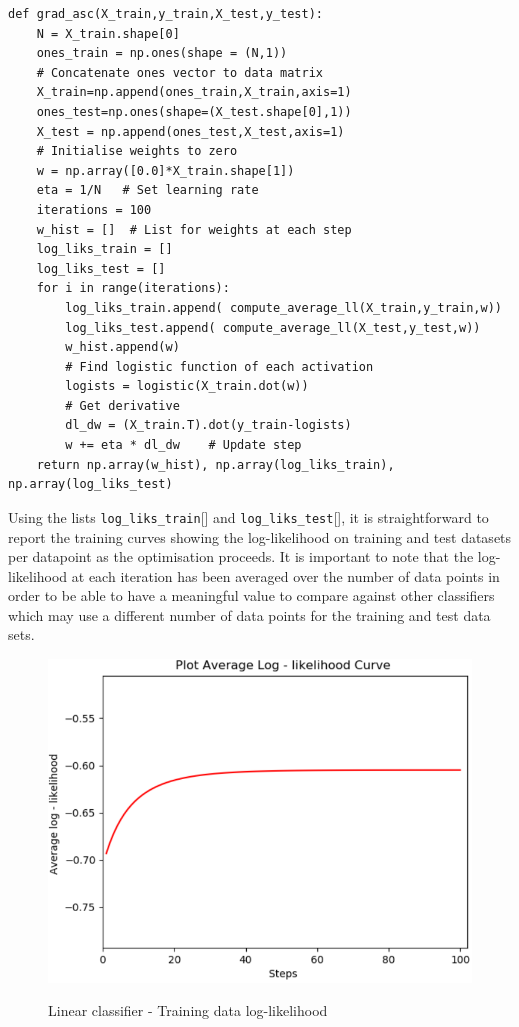 \documentclass[twocolumn]{article}
\begin{document}
\begin{verbatim}
def grad_asc(X_train,y_train,X_test,y_test):
    N = X_train.shape[0]
    ones_train = np.ones(shape = (N,1))
    # Concatenate ones vector to data matrix
    X_train=np.append(ones_train,X_train,axis=1)   
    ones_test=np.ones(shape=(X_test.shape[0],1))
    X_test = np.append(ones_test,X_test,axis=1)
    # Initialise weights to zero
    w = np.array([0.0]*X_train.shape[1])  
    eta = 1/N   # Set learning rate
    iterations = 100 
    w_hist = []  # List for weights at each step
    log_liks_train = []
    log_liks_test = []
    for i in range(iterations):
        log_liks_train.append( compute_average_ll(X_train,y_train,w))
        log_liks_test.append( compute_average_ll(X_test,y_test,w))
        w_hist.append(w)
        # Find logistic function of each activation
        logists = logistic(X_train.dot(w))
        # Get derivative
        dl_dw = (X_train.T).dot(y_train-logists)
        w += eta * dl_dw    # Update step
    return np.array(w_hist), np.array(log_liks_train), np.array(log_liks_test)
\end{verbatim}

Using the lists \texttt{log\_liks\_train}[] and \texttt{log\_liks\_test}[], it is straightforward to report the training curves showing the log-likelihood on training and test datasets per datapoint as the optimisation proceeds. It is important to note that the log-likelihood at each iteration has been averaged over the number of data points in order to be able to have a meaningful value to compare against other classifiers which may use a different number of data points for the training and test data sets.

\begin{figure}[!htb]
	\centering\includegraphics[width=\columnwidth]{b}\\
	\caption{Linear classifier - Training data log-likelihood}\label{triangul}
\end{figure}
\end{document}
